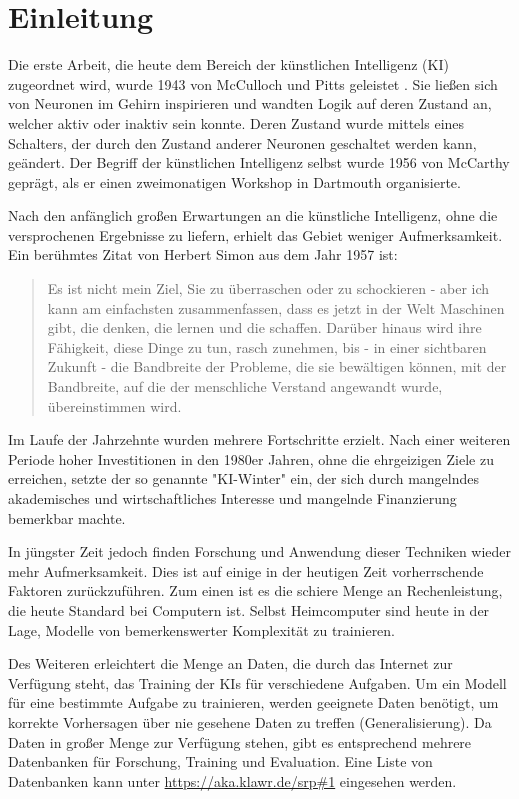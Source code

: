 \section{Einleitung}

Die erste Arbeit, die heute dem Bereich der künstlichen Intelligenz (KI) zugeordnet wird, wurde 1943 von McCulloch und Pitts geleistet \cite{McCulloch1943}.
Sie ließen sich von Neuronen im Gehirn inspirieren und wandten Logik auf deren Zustand an, welcher aktiv oder inaktiv sein konnte.
Deren Zustand wurde mittels eines Schalters, der durch den Zustand anderer Neuronen geschaltet werden kann, geändert.
Der Begriff der künstlichen Intelligenz selbst wurde 1956 von McCarthy geprägt, als er einen zweimonatigen Workshop in Dartmouth \cite{McCarthy1955} organisierte.

Nach den anfänglich großen Erwartungen an die künstliche Intelligenz, ohne die versprochenen Ergebnisse zu liefern, erhielt das Gebiet weniger Aufmerksamkeit.
Ein berühmtes Zitat von Herbert Simon aus dem Jahr 1957 ist:
\begin{quotation}
    Es ist nicht mein Ziel, Sie zu überraschen oder zu schockieren - aber ich kann am einfachsten zusammenfassen, dass es jetzt in der Welt Maschinen gibt, die denken, die lernen und die schaffen. Darüber hinaus wird ihre Fähigkeit, diese Dinge zu tun, rasch zunehmen, bis - in einer sichtbaren Zukunft - die Bandbreite der Probleme, die sie bewältigen können, mit der Bandbreite, auf die der menschliche Verstand angewandt wurde, übereinstimmen wird.
\end{quotation}

Im Laufe der Jahrzehnte wurden mehrere Fortschritte erzielt.
Nach einer weiteren Periode hoher Investitionen in den 1980er Jahren, ohne die ehrgeizigen Ziele zu erreichen, setzte der so genannte "KI-Winter" ein, der sich durch mangelndes akademisches und wirtschaftliches Interesse und mangelnde Finanzierung bemerkbar machte.

In jüngster Zeit jedoch finden Forschung und Anwendung dieser Techniken wieder mehr Aufmerksamkeit.
Dies ist auf einige in der heutigen Zeit vorherrschende Faktoren zurückzuführen.
Zum einen ist es die schiere Menge an Rechenleistung, die heute Standard bei Computern ist.
Selbst Heimcomputer sind heute in der Lage, Modelle von bemerkenswerter Komplexität zu trainieren.

Des Weiteren erleichtert die Menge an Daten, die durch das Internet zur Verfügung steht, das Training der KIs für verschiedene Aufgaben.
Um ein Modell für eine bestimmte Aufgabe zu trainieren, werden geeignete Daten benötigt, um korrekte Vorhersagen über nie gesehene Daten zu treffen (Generalisierung).
Da Daten in großer Menge zur Verfügung stehen, gibt es entsprechend mehrere Datenbanken für Forschung, Training und Evaluation.
Eine Liste von Datenbanken kann unter \url{https://aka.klawr.de/srp\#1} eingesehen werden.

